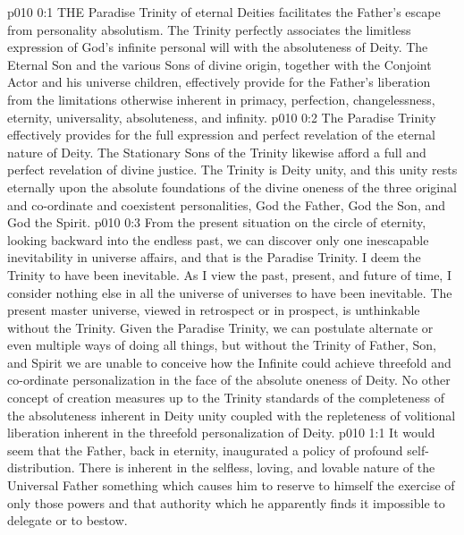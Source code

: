 \vs p010 0:1 THE Paradise Trinity of eternal Deities facilitates the Father’s escape from personality absolutism. The Trinity perfectly associates the limitless expression of God’s infinite personal will with the absoluteness of Deity. The Eternal Son and the various Sons of divine origin, together with the Conjoint Actor and his universe children, effectively provide for the Father’s liberation from the limitations otherwise inherent in primacy, perfection, changelessness, eternity, universality, absoluteness, and infinity.
\vs p010 0:2 The Paradise Trinity effectively provides for the full expression and perfect revelation of the eternal nature of Deity. The Stationary Sons of the Trinity likewise afford a full and perfect revelation of divine justice. The Trinity is Deity unity, and this unity rests eternally upon the absolute foundations of the divine oneness of the three original and co\hyp{}ordinate and coexistent personalities, God the Father, God the Son, and God the Spirit.
\vs p010 0:3 \pc From the present situation on the circle of eternity, looking backward into the endless past, we can discover only one inescapable inevitability in universe affairs, and that is the Paradise Trinity. I deem the Trinity to have been inevitable. As I view the past, present, and future of time, I consider nothing else in all the universe of universes to have been inevitable. The present master universe, viewed in retrospect or in prospect, is unthinkable without the Trinity. Given the Paradise Trinity, we can postulate alternate or even multiple ways of doing all things, but without the Trinity of Father, Son, and Spirit we are unable to conceive how the Infinite could achieve threefold and co\hyp{}ordinate personalization in the face of the absolute oneness of Deity. No other concept of creation measures up to the Trinity standards of the completeness of the absoluteness inherent in Deity unity coupled with the repleteness of volitional liberation inherent in the threefold personalization of Deity.
\vs p010 1:1 It would seem that the Father, back in eternity, inaugurated a policy of profound self\hyp{}distribution. There is inherent in the selfless, loving, and lovable nature of the Universal Father something which causes him to reserve to himself the exercise of only those powers and that authority which he apparently finds it impossible to delegate or to bestow.
